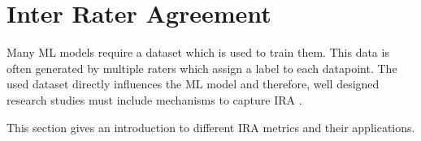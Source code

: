 \section{Inter Rater Agreement}
\label{chp:fundamentals:sec:inter_rater_agreement}
Many \ac{ML} models require a dataset which is used to train them.
This data is often generated by multiple raters which assign a label to each datapoint.
The used dataset directly influences the \ac{ML} model \parencite{Gray:2011} and therefore, well designed research studies must include mechanisms to capture \ac{IRA} \parencite{McHugh:2012}.

This section gives an introduction to different \ac{IRA} metrics and their applications.





